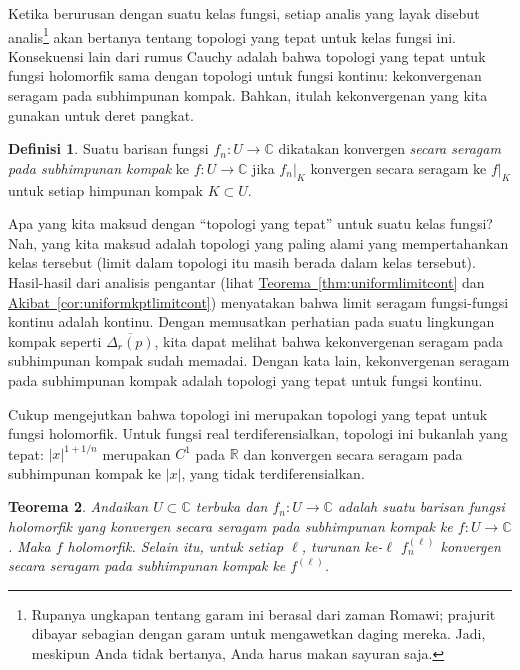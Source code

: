 \documentclass[12pt,openany]{book}
\newcommand{\sabs}[1]{\lvert {#1} \rvert}
\newcommand{\C}{{\mathbb{C}}}
\newcommand{\R}{{\mathbb{R}}}
\newcommand{\myindex}[1]{#1\index{#1}}
\newcommand{\myquote}[1]{``#1''}
\theoremstyle{plain}
\newtheorem{thm}{Teorema}[section]
\theoremstyle{remark}
\theoremstyle{definition}
\newtheorem{defn}[thm]{Definisi}
\theoremstyle{exercise}
\theoremstyle{example}
\newcommand{\thmref}[1]{\hyperref[#1]{Teorema~\ref*{#1}}}
\newcommand{\corref}[1]{\hyperref[#1]{Akibat~\ref*{#1}}}
\begin{document}
Ketika berurusan dengan suatu kelas fungsi, setiap analis yang layak disebut
analis\footnote{Rupanya ungkapan tentang garam ini
berasal dari zaman Romawi; prajurit
dibayar sebagian dengan garam untuk mengawetkan daging mereka.  Jadi, meskipun Anda tidak bertanya,
Anda harus makan sayuran saja.} akan bertanya tentang topologi yang tepat untuk kelas
fungsi ini.
Konsekuensi lain dari rumus Cauchy adalah bahwa topologi yang tepat untuk
fungsi holomorfik sama dengan topologi untuk fungsi kontinu: kekonvergenan seragam
pada subhimpunan kompak.  Bahkan, itulah kekonvergenan yang kita
gunakan untuk deret pangkat.

\begin{defn}
Suatu barisan fungsi $f_n \colon U \to \C$ dikatakan konvergen
\emph{\myindex{secara seragam pada subhimpunan kompak}}%
ke $f \colon U \to \C$ jika
$f_n|_K$ konvergen secara seragam ke $f|_K$
untuk setiap himpunan kompak $K \subset U$.
\end{defn}

Apa yang kita maksud dengan \myquote{topologi yang tepat} untuk suatu kelas fungsi?
Nah, yang kita maksud adalah topologi yang paling alami
yang mempertahankan kelas tersebut (limit dalam topologi itu masih berada dalam
kelas tersebut).  
Hasil-hasil dari analisis pengantar
(lihat \thmref{thm:uniformlimitcont} dan \corref{cor:uniformkptlimitcont})
menyatakan bahwa limit seragam fungsi-fungsi kontinu adalah kontinu.
Dengan memusatkan perhatian pada suatu lingkungan kompak seperti $\overline{\Delta_r(p)}$,
kita dapat melihat bahwa kekonvergenan seragam pada subhimpunan kompak sudah memadai.
Dengan kata lain, kekonvergenan seragam pada subhimpunan kompak adalah topologi yang tepat
untuk fungsi kontinu.

Cukup mengejutkan bahwa topologi ini merupakan topologi yang tepat untuk fungsi
holomorfik.  Untuk fungsi real
terdiferensialkan, topologi ini bukanlah yang tepat: $\sabs{x}^{1+1/n}$
merupakan $C^1$ pada $\R$ dan konvergen secara seragam pada subhimpunan kompak ke $\sabs{x}$,
yang tidak terdiferensialkan.

\begin{thm} \label{thm:unifoncompact}
Andaikan $U \subset \C$ terbuka dan $f_n \colon U \to \C$ adalah suatu barisan
fungsi holomorfik yang konvergen secara seragam pada subhimpunan kompak ke
$f \colon U \to \C$.  Maka $f$ holomorfik.
Selain itu, untuk setiap $\ell$, turunan ke-$\ell$
$f_n^{(\ell)}$ konvergen secara seragam pada subhimpunan kompak ke $f^{(\ell)}$.
\end{thm}
\end{document}
